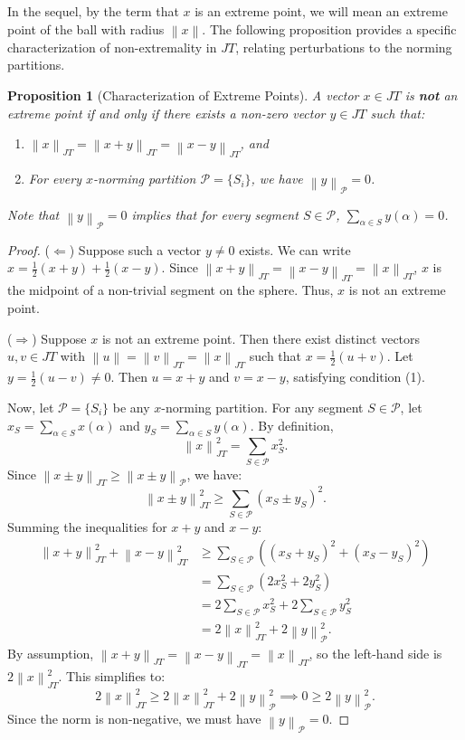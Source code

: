 \documentclass[11pt,a4paper]{amsart}
\newtheorem{proposition}[theorem]{Proposition}
\newcommand{\JT}{JT}
\newcommand{\norm}[1]{\left\lVert#1\right\rVert}
\begin{document}
In the sequel, by the term that $x$ is an extreme point, we will mean an extreme point of the ball with radius $\norm{x}$. The following proposition provides a specific characterization of non-extremality in $\JT$, relating perturbations to the norming partitions.

\begin{proposition}[Characterization of Extreme Points]\label{prop.1}
    A vector $x \in \JT$ is \textbf{not} an extreme point if and only if there exists a non-zero vector $y \in \JT$ such that:
    \begin{enumerate}
        \item $\norm{x}_{\JT} = \norm{x+y}_{\JT} = \norm{x-y}_{\JT}$, and
        \item For every $x$-norming partition $\mathcal{P} = \{S_i\}$, we have $\norm{y}_{\mathcal{P}} = 0$.
    \end{enumerate}
    Note that $\norm{y}_{\mathcal{P}} = 0$ implies that for every segment $S \in \mathcal{P}$, $\sum_{\alpha \in S} y(\alpha) = 0$.
\end{proposition}

\begin{proof}
    ($\Leftarrow$) Suppose such a vector $y \neq 0$ exists. We can write $x = \frac{1}{2}(x+y) + \frac{1}{2}(x-y)$. Since $\norm{x+y}_{\JT} = \norm{x-y}_{\JT} = \norm{x}_{\JT}$, $x$ is the midpoint of a non-trivial segment on the sphere. Thus, $x$ is not an extreme point.

    ($\Rightarrow$) Suppose $x$ is not an extreme point. Then there exist distinct vectors $u, v \in \JT$ with $\norm{u} = \norm{v}_{\JT} = \norm{x}_{\JT}$ such that $x = \frac{1}{2}(u+v)$. Let $y = \frac{1}{2}(u-v) \neq 0$. Then $u = x+y$ and $v = x-y$, satisfying condition (1).

    Now, let $\mathcal{P} = \{S_i\}$ be any $x$-norming partition. For any segment $S \in \mathcal{P}$, let $x_S = \sum_{\alpha \in S} x(\alpha)$ and $y_S = \sum_{\alpha \in S} y(\alpha)$. By definition,
    \[ \norm{x}_{\JT}^2 = \sum_{S \in \mathcal{P}} x_S^2. \]
    Since $\norm{x \pm y}_{\JT} \ge \norm{x \pm y}_{\mathcal{P}}$, we have:
    \[ \norm{x \pm y}_{\JT}^2 \ge \sum_{S \in \mathcal{P}} (x_S \pm y_S)^2. \]
    Summing the inequalities for $x+y$ and $x-y$:
    \begin{align*}
        \norm{x+y}_{\JT}^2 + \norm{x-y}_{\JT}^2 &\ge \sum_{S \in \mathcal{P}} \left( (x_S + y_S)^2 + (x_S - y_S)^2 \right) \\
        &= \sum_{S \in \mathcal{P}} (2x_S^2 + 2y_S^2) \\
        &= 2\sum_{S \in \mathcal{P}} x_S^2 + 2\sum_{S \in \mathcal{P}} y_S^2 \\
        &= 2\norm{x}_{\JT}^2 + 2\norm{y}_{\mathcal{P}}^2.
    \end{align*}
    By assumption, $\norm{x+y}_{\JT} = \norm{x-y}_{\JT} = \norm{x}_{\JT}$, so the left-hand side is $2\norm{x}_{\JT}^2$. This simplifies to:
    \[ 2\norm{x}_{\JT}^2 \ge 2\norm{x}_{\JT}^2 + 2\norm{y}_{\mathcal{P}}^2 \implies 0 \ge 2\norm{y}_{\mathcal{P}}^2. \]
    Since the norm is non-negative, we must have $\norm{y}_{\mathcal{P}} = 0$.
\end{proof}
\end{document}
